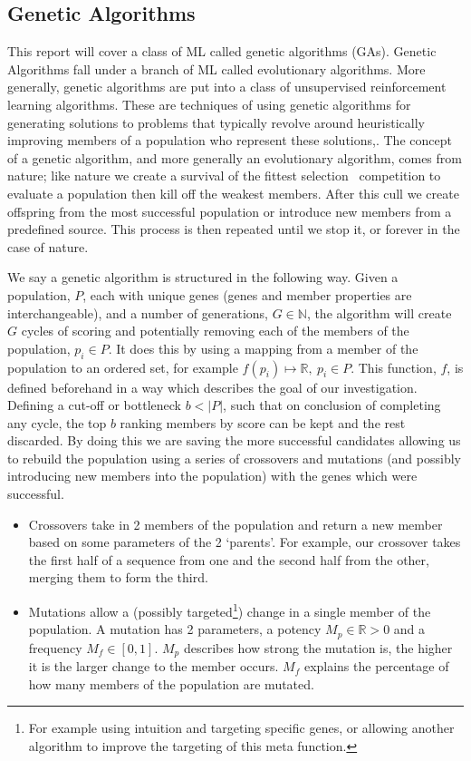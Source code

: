 \subsection{Genetic Algorithms}\label{subsec:geneticAlgorithms}
This report will cover a class of ML called genetic algorithms (GAs).
Genetic Algorithms fall under a branch of ML called evolutionary algorithms.
More generally, genetic algorithms are put into a class of unsupervised reinforcement learning algorithms.
These are techniques of using genetic algorithms for generating solutions to problems that typically revolve around heuristically improving members of a population who represent these solutions,\cite{horn1994niched,rahmat1999electromagnetic}.
The concept of a genetic algorithm, and more generally an evolutionary algorithm, comes from nature;
like nature we create a survival of the fittest selection~\cite{darwin2009origin} competition to evaluate a population then kill off the weakest members.
After this cull we create offspring from the most successful population or introduce new members from a predefined source.
This process is then repeated until we stop it, or forever in the case of nature.

We say a genetic algorithm is structured in the following way.
Given a population, \(P\), each with unique genes (genes and member properties are interchangeable), and a number of generations, \(G\in \mathbb{N}\), the algorithm will create \(G\) cycles of scoring and potentially removing each of the members of the population, \(p_i \in P\).
It does this by using a mapping from a member of the population to an ordered set, for example \(f(p_i)\mapsto \mathbb{R},\ p_i \in P\).
This function, \(f\), is defined beforehand in a way which describes the goal of our investigation.
Defining a cut-off or bottleneck \(b<|P|\), such that on conclusion of completing any cycle, the top \(b\) ranking members by score can be kept and the rest discarded.
By doing this we are saving the more successful candidates allowing us to rebuild the population using a series of crossovers and mutations (and possibly introducing new members into the population) with the genes which were successful.

\begin{itemize}
    \item Crossovers take in 2 members of the population and return a new member based on some parameters of the 2 `parents'.
    For example, our crossover takes the first half of a sequence from one and the second half from the other, merging them to form the third.
    \item Mutations allow a (possibly targeted\footnote{For example using intuition and targeting specific genes, or allowing another algorithm to improve the targeting of this meta function.}) change in a single member of the population.
    A mutation has 2 parameters, a potency \(M_p\in \mathbb{R}>0\) and a frequency \(M_f\in [0,1]\).
    \(M_p\) describes how strong the mutation is, the higher it is the larger change to the member occurs.
    \(M_f\) explains the percentage of how many members of the population are mutated.
\end{itemize}

